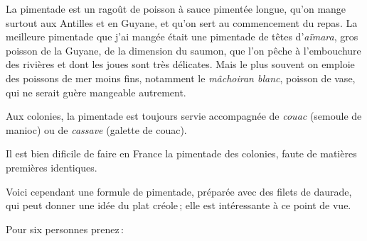 La pimentade est un ragoût de poisson à sauce pimentée longue, qu'on mange
surtout aux Antilles et en Guyane, et qu'on sert au commencement du repas. La
meilleure pimentade que j'ai mangée était une pimentade de têtes
d'\textit{aïmara}, gros poisson de la Guyane, de la dimension du saumon, que
l'on pêche à l'embouchure des rivières et dont les joues sont très délicates.
Mais le plus souvent on emploie des poissons de mer moins fins, notamment le
\textit{mâchoiran blanc}, poisson de vase, qui ne serait guère mangeable
autrement.

Aux colonies, la pimentade est toujours servie accompagnée de \textit{couac}
(semoule de manioc) ou de \textit{cassave} (galette de couac).

Il est bien dificile de faire en France la pimentade des colonies, faute de
matières premières identiques.

Voici cependant une formule de pimentade, préparée avec des filets de daurade,
qui peut donner une idée du plat créole ; elle est intéressante à ce point de
vue.

\medskip

Pour six personnes prenez :

\medskip

